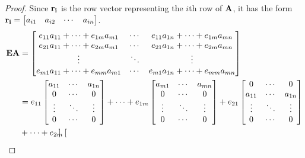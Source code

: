 \documentclass[../main.tex]{subfiles}
\begin{document}
\begin{proof}
	Since $\mathbf{r_i}$ is the row vector representing the $i$th row of
	$\mathbf{A}$, it has the form\\
	$\mathbf{r_i}=\begin{bmatrix}a_{i1}&a_{i2}&\cdots&a_{in}\end{bmatrix}$.
	\begin{align*}
		\mathbf{E}\mathbf{A} & =\begin{bmatrix}
			                    e_{11}a_{11}+\cdots+e_{1m}a_{m1} & \cdots & e_{11}a_{1n}+\cdots +e_{1m}a_{mn} \\
			                    e_{21}a_{11}+\cdots+e_{2m}a_{m1} & \cdots & e_{21}a_{1n}+\cdots +e_{2m}a_{mn} \\
			                    \vdots                           & \ddots & \vdots                            \\
			                    e_{m1}a_{11}+\cdots+e_{mm}a_{m1} & \cdots & e_{m1}a_{1n}+\cdots +e_{mm}a_{mn}
		                    \end{bmatrix} \\
		                 & =e_{11}\begin{bmatrix}
			                          a_{11} & \cdots & a_{1n} \\
			                          0      & \cdots & 0      \\
			                          \vdots & \ddots & \vdots \\
			                          0      & \cdots & 0
		                          \end{bmatrix}+\cdots+
		e_{1m}\begin{bmatrix}
			      a_{m1} & \cdots & a_{mn} \\
			      0      & \cdots & 0      \\
			      \vdots & \ddots & \vdots \\
			      0      & \cdots & 0
		      \end{bmatrix}+
		e_{21}\begin{bmatrix}
			      0      & \cdots & 0      \\
			      a_{11} & \cdots & a_{1n} \\
			      \vdots & \ddots & \vdots \\
			      0      & \cdots & 0
		      \end{bmatrix}                                                                    \\
		                 & +\cdots+e_{2m}\begin{bmatrix}

\end{bmatrix}
\end{align*}
\end{proof}
\end{document}
